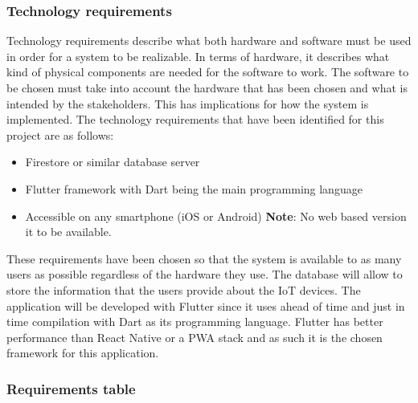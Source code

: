 \subsubsection*{Technology requirements}

Technology requirements describe what both hardware and software must be
used in order for a system to be realizable. In terms of hardware, it describes
what kind of physical components are needed for the software to work. The
software to be chosen must take into account the hardware that has been
chosen and what is intended by the stakeholders. This has implications for
how the system is implemented.
\newline
The technology requirements that have been identified for this project are as follows:
\begin{itemize}
    \item Firestore or similar database server
    \item Flutter framework with Dart being the main programming language
    \item Accessible on any smartphone (iOS or Android) \newline \textbf{Note}: No web based version it to be available.
\end{itemize}
These requirements have been chosen so that the system is available to as
many users as possible regardless of the hardware they use. The database
will allow to store the information that the users provide about the IoT
devices. The application will be developed with Flutter since it uses ahead
of time and just in time compilation with Dart as its programming language.
Flutter has better performance than React Native or a PWA stack and as such it is the chosen framework for
this application.

\subsubsection*{Requirements table}

